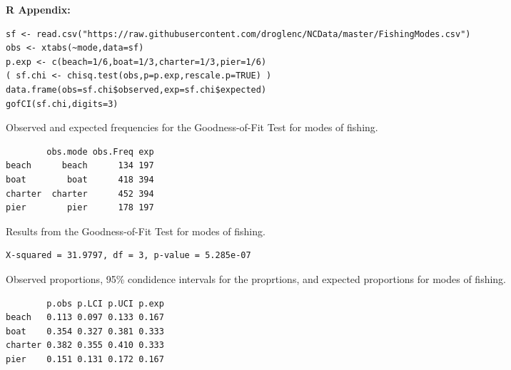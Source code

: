\documentclass[10pt,openany]{book}\usepackage[]{graphicx}\usepackage[]{color}
\makeatletter
\newenvironment{kframe}{%
 \def\at@end@of@kframe{}%
 \ifinner\ifhmode%
  \def\at@end@of@kframe{\end{minipage}}%
  \begin{minipage}{\columnwidth}%
 \fi\fi%
 \def\FrameCommand##1{\hskip\@totalleftmargin \hskip-\fboxsep
 \colorbox{shadecolor}{##1}\hskip-\fboxsep
     \hskip-\linewidth \hskip-\@totalleftmargin \hskip\columnwidth}%
 \MakeFramed {\advance\hsize-\width
   \@totalleftmargin\z@ \linewidth\hsize
   \@setminipage}}%
 {\par\unskip\endMakeFramed%
 \at@end@of@kframe}
\newenvironment{knitrout}{}{} %
\makeatother
\begin{document}
\begin{minipage}{\textwidth}
\textbf{R Appendix:}
\begin{knitrout}
\color{fgcolor}\begin{kframe}
\begin{verbatim}
sf <- read.csv("https://raw.githubusercontent.com/droglenc/NCData/master/FishingModes.csv")
obs <- xtabs(~mode,data=sf)
p.exp <- c(beach=1/6,boat=1/3,charter=1/3,pier=1/6)
( sf.chi <- chisq.test(obs,p=p.exp,rescale.p=TRUE) )
data.frame(obs=sf.chi$observed,exp=sf.chi$expected)
gofCI(sf.chi,digits=3)
\end{verbatim}
\end{kframe}
\end{knitrout}
\end{minipage}

\begin{table}[h]
  \caption{Observed and expected frequencies for the Goodness-of-Fit Test for modes of fishing.}
  \label{tab:GOFfishRes}
  \vspace{-12pt}
\begin{knitrout}
\color{fgcolor}\begin{kframe}
\begin{verbatim}
        obs.mode obs.Freq exp
beach      beach      134 197
boat        boat      418 394
charter  charter      452 394
pier        pier      178 197
\end{verbatim}
\end{kframe}
\end{knitrout}
\end{table}

\begin{table}[h]
  \caption{Results from the Goodness-of-Fit Test for modes of fishing.}
  \label{tab:GOFfishChi}
  \vspace{-12pt}
\begin{knitrout}
\color{fgcolor}\begin{kframe}
\begin{verbatim}
X-squared = 31.9797, df = 3, p-value = 5.285e-07
\end{verbatim}
\end{kframe}
\end{knitrout}
\end{table}

\begin{table}[h]
  \caption{Observed proportions, 95\% condidence intervals for the proprtions, and expected proportions for modes of fishing.}
  \label{tab:GOFfishCIs}
  \vspace{-12pt}
\begin{knitrout}
\color{fgcolor}\begin{kframe}
\begin{verbatim}
        p.obs p.LCI p.UCI p.exp
beach   0.113 0.097 0.133 0.167
boat    0.354 0.327 0.381 0.333
charter 0.382 0.355 0.410 0.333
pier    0.151 0.131 0.172 0.167
\end{verbatim}
\end{kframe}
\end{knitrout}
\end{table}
\end{document}
